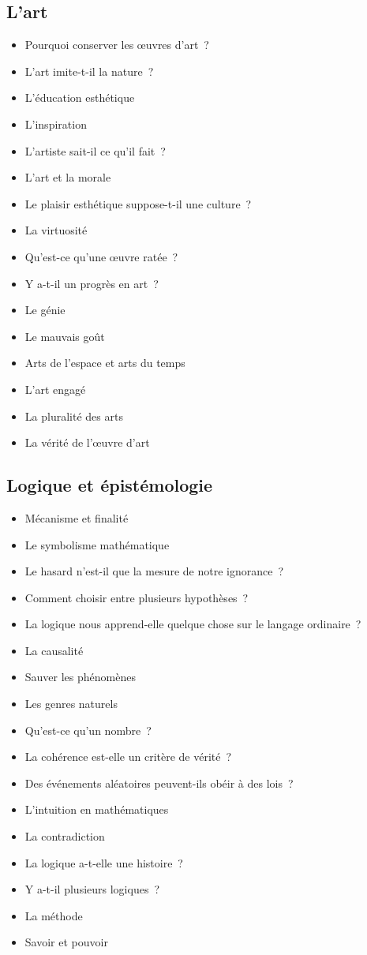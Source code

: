 \documentclass[a4paper,11pt]{article}
\newenvironment{liste}{\begin{itemize}}{\end{itemize}}
\begin{document}
\subsection{L'art}

\begin{liste}
  \item Pourquoi conserver les œuvres d'art~?
  \item L'art imite-t-il la nature~?
  \item L'éducation esthétique
  \item L'inspiration
  \item L'artiste sait-il ce qu'il fait~?
  \item L'art et la morale
  \item Le plaisir esthétique suppose-t-il une culture~?
  \item La virtuosité
  \item Qu'est-ce qu'une œuvre ratée~?
  \item Y a-t-il un progrès en art~?
  \item Le génie
  \item Le mauvais goût
  \item Arts de l'espace et arts du temps
  \item L'art engagé
  \item La pluralité des arts
  \item La vérité de l'œuvre d'art
\end{liste}

\subsection{Logique et épistémologie}

\begin{liste}
\item Mécanisme et finalité
\item Le symbolisme mathématique
\item Le hasard n'est-il que la mesure de notre ignorance~?
\item Comment choisir entre plusieurs hypothèses~?
\item La logique nous apprend-elle quelque chose sur le langage
  ordinaire~?
\item La causalité
\item Sauver les phénomènes
\item Les genres naturels
\item Qu'est-ce qu'un nombre~?
\item La cohérence est-elle un critère de vérité~?
\item Des événements aléatoires peuvent-ils obéir à des lois~?
\item L'intuition en mathématiques
\item La contradiction
\item La logique a-t-elle une histoire~?
\item Y a-t-il plusieurs logiques~?
\item La méthode
\item Savoir et pouvoir
\end{liste}
\end{document}
